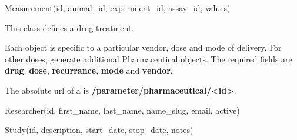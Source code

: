 \documentclass[letterpaper,10pt,english]{sphinxmanual}
\begin{document}

\begin{fulllineitems}
\label{data:mousedb.data.models.Measurement}
Measurement(id, animal\_id, experiment\_id, assay\_id, values)

\end{fulllineitems}


\begin{fulllineitems}
\label{data:mousedb.data.models.Pharmaceutical}
This class defines a drug treatment.

Each object is specific to a particular vendor, dose and mode of delivery.
For other doses, generate additional Pharmaceutical objects.    
The required fields are \textbf{drug}, \textbf{dose}, \textbf{recurrance}, \textbf{mode} and \textbf{vendor}.

\begin{fulllineitems}
\label{data:mousedb.data.models.Pharmaceutical.get_absolute_url}
The absolute url of a  is  \textbf{/parameter/pharmaceutical/\textless{}id\textgreater{}}.

\end{fulllineitems}


\end{fulllineitems}


\begin{fulllineitems}
\label{data:mousedb.data.models.Researcher}
Researcher(id, first\_name, last\_name, name\_slug, email, active)

\end{fulllineitems}


\begin{fulllineitems}
\label{data:mousedb.data.models.Study}
Study(id, description, start\_date, stop\_date, notes)

\end{fulllineitems}
\end{document}

